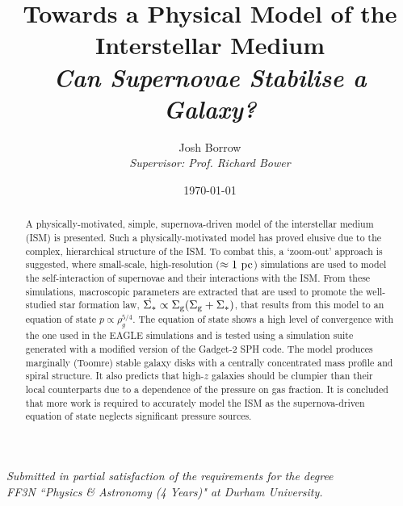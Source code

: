 
\begin{titlepage}

\thispagestyle{empty}

\author{Josh Borrow\\
\vspace{10mm}
\emph{Supervisor: Prof. Richard Bower}\\
\vspace{5mm}}
\date{\today}
\title{Towards a Physical Model of the Interstellar Medium\\
\vspace{4mm}
\large \emph{Can Supernovae Stabilise a Galaxy?}
\vspace{10mm}}
\maketitle

\vspace{10mm}

\begin{center}
\emph{{\small Submitted in partial satisfaction of the requirements for the degree}}\\
\emph{{\small FF3N ``Physics \& Astronomy (4 Years)" at Durham University.}}
\end{center}

\vspace{20mm}
\begin{abstract}
\noindent    A physically-motivated, simple, supernova-driven model of the interstellar medium (ISM) is presented.
    Such a physically-motivated model has proved elusive due to the complex, hierarchical structure of the ISM.
    To combat this, a `zoom-out' approach is suggested, where small-scale, high-resolution ($\approx 1 ~\mathrm{pc}$) simulations are used to model the self-interaction of supernovae and their interactions with the ISM.
    From these simulations, macroscopic parameters are extracted that are used to promote the well-studied star formation law, $\dot{\Sigma_*} \propto \Sigma_\mathrm{g} (\Sigma_\mathrm{g} + \Sigma_*)$, that results from this model to an equation of state $p \propto \rho_g^{5/4}$.
    The equation of state shows a high level of convergence with the one used in the EAGLE simulations and is tested using a simulation suite generated with a modified version of the Gadget-2 SPH code.
    The model produces marginally (Toomre) stable galaxy disks with a centrally concentrated  mass profile and spiral structure.
    It also predicts that high-$z$ galaxies should be clumpier than their local counterparts due to a dependence of the pressure on gas fraction.
    It is concluded that more work is required to accurately model the ISM as the supernova-driven equation of state neglects significant pressure sources.
\end{abstract}

\end{titlepage}

\newpage

